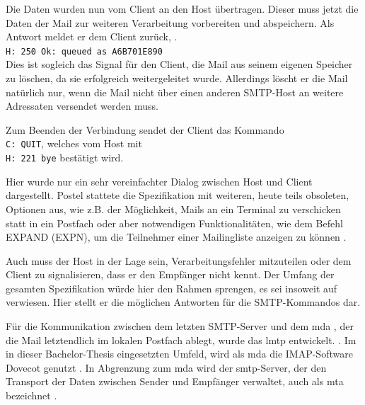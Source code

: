Die Daten wurden nun vom Client an den Host übertragen. Dieser muss jetzt die Daten der Mail zur weiteren Verarbeitung vorbereiten und abspeichern. Als Antwort meldet er dem Client zurück,  \citep[][25]{Heinlein2004}.\\
\verb+H: 250 Ok: queued as A6B701E890+ \\
Dies ist sogleich das Signal für den Client, die Mail aus seinem eigenen Speicher zu löschen, da sie erfolgreich weitergeleitet wurde. Allerdings löscht er die Mail natürlich nur, wenn die Mail nicht über einen anderen SMTP-Host an weitere Adressaten versendet werden muss.

Zum Beenden der Verbindung sendet der Client das Kommando \\
\verb+C: QUIT+, welches vom Host mit \\
\verb+H: 221 bye+ bestätigt wird. 

Hier wurde nur ein sehr vereinfachter Dialog zwischen Host und Client dargestellt. Postel stattete die Spezifikation mit weiteren, heute teils obsoleten, Optionen aus, wie z.B. der Möglichkeit, Mails an ein Terminal zu verschicken statt in ein Postfach \citep[vgl.][11]{rfc821} oder aber notwendigen Funktionalitäten, wie dem Befehl EXPAND (EXPN), um die Teilnehmer einer Mailingliste anzeigen zu können \citep[vgl.][8]{rfc821}.
\citereset

Auch muss der Host in der Lage sein, Verarbeitungsfehler mitzuteilen oder dem Client zu signalisieren, dass er den Empfänger nicht kennt. Der Umfang der gesamten Spezifikation würde hier den Rahmen sprengen, es sei insoweit auf \cite[][S. 37 ff.]{rfc821} verwiesen. Hier stellt er die möglichen Antworten für die SMTP-Kommandos dar.

Für die Kommunikation zwischen dem letzten SMTP-Server und dem \ac{mda} \citep[vgl.][28]{Heinlein2004}, der die Mail letztendlich im lokalen Postfach ablegt, wurde das \ac{lmtp} entwickelt.  \citep[][39]{Heinlein2004}. Im in dieser Bachelor-Thesis eingesetzten Umfeld, wird als \ac{mda} die IMAP-Software Dovecot genutzt \citep[vgl.][]{dovecotlmtp}. In Abgrenzung zum \ac{mda} wird der \ac{smtp}-Server, der den Transport der Daten zwischen Sender und Empfänger verwaltet, auch als \ac{mta} bezeichnet \citep[vgl.][28]{Heinlein2004}.

